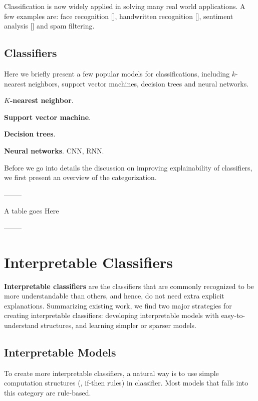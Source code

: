 Classification is now widely applied in solving many real world applications. A few examples are: face recognition [], handwritten recognition [], sentiment analysis [] and spam filtering.


\subsection{Classifiers}

Here we briefly present a few popular models for classifications, including $k$-nearest neighbors, support vector machines, decision trees and neural networks.

\textbf{$K$-nearest neighbor}.

\textbf{Support vector machine}.

\textbf{Decision trees}.

\textbf{Neural networks}. CNN, RNN.

Before we go into details the discussion on improving explainability of classifiers, we first present an overview of the categorization.

--------

A table goes Here

--------

\section{Interpretable Classifiers}\label{sec:interpretable-classifier}

\textbf{Interpretable classifiers} are the classifiers that are commonly recognized to be more understandable than others, and hence, do not need extra explicit explanations. Summarizing existing work, we find two major strategies for creating interpretable classifiers: developing interpretable models with easy-to-understand structures, and learning simpler or sparser models.

\subsection{Interpretable Models}

To create more interpretable classifiers, a natural way is to use simple computation structures (\eg, if-then rules) in classifier. Most models that falls into this category are rule-based. 

